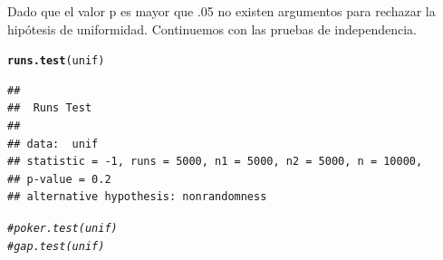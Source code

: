 \documentclass[12 pt]{article}\usepackage[]{graphicx}\usepackage[]{color}
\makeatletter
\newcommand{\hlcom}[1]{\textcolor[rgb]{0.678,0.584,0.686}{\textit{#1}}}%
\newcommand{\hlstd}[1]{\textcolor[rgb]{0.345,0.345,0.345}{#1}}%
\newcommand{\hlkwd}[1]{\textcolor[rgb]{0.737,0.353,0.396}{\textbf{#1}}}%
\newenvironment{kframe}{%
 \def\at@end@of@kframe{}%
 \ifinner\ifhmode%
  \def\at@end@of@kframe{\end{minipage}}%
  \begin{minipage}{\columnwidth}%
 \fi\fi%
 \def\FrameCommand##1{\hskip\@totalleftmargin \hskip-\fboxsep
 \colorbox{shadecolor}{##1}\hskip-\fboxsep
     \hskip-\linewidth \hskip-\@totalleftmargin \hskip\columnwidth}%
 \MakeFramed {\advance\hsize-\width
   \@totalleftmargin\z@ \linewidth\hsize
   \@setminipage}}%
 {\par\unskip\endMakeFramed%
 \at@end@of@kframe}
\newenvironment{knitrout}{}{} %
\makeatother
\begin{document}
\begin{enumerate}
\begin{knitrout}
\begin{kframe}
{\ttfamily\noindent\bfseries\color{errorcolor}{\#\# Error in eval(expr, envir, enclos): objeto 'a' no encontrado}}\end{kframe}
\end{knitrout}

Dado que el valor p es mayor que .05 no existen argumentos para rechazar la hipótesis de uniformidad. Continuemos con las pruebas de independencia.

\begin{knitrout}
\color{fgcolor}\begin{kframe}
\begin{alltt}
\hlkwd{runs.test}\hlstd{(unif)}
\end{alltt}
\begin{verbatim}
## 
## 	Runs Test
## 
## data:  unif
## statistic = -1, runs = 5000, n1 = 5000, n2 = 5000, n = 10000,
## p-value = 0.2
## alternative hypothesis: nonrandomness
\end{verbatim}
\begin{alltt}
\hlcom{#poker.test(unif)}
\hlcom{#gap.test(unif)}
\end{alltt}
\end{kframe}
\end{knitrout}



\end{enumerate}
\end{document}
